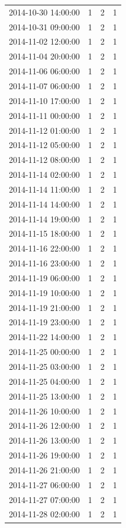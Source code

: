 \begin{tabular}{lrrr}
2014-10-30 14:00:00 & 1 & 2 & 1 \\
2014-10-31 09:00:00 & 1 & 2 & 1 \\
2014-11-02 12:00:00 & 1 & 2 & 1 \\
2014-11-04 20:00:00 & 1 & 2 & 1 \\
2014-11-06 06:00:00 & 1 & 2 & 1 \\
2014-11-07 06:00:00 & 1 & 2 & 1 \\
2014-11-10 17:00:00 & 1 & 2 & 1 \\
2014-11-11 00:00:00 & 1 & 2 & 1 \\
2014-11-12 01:00:00 & 1 & 2 & 1 \\
2014-11-12 05:00:00 & 1 & 2 & 1 \\
2014-11-12 08:00:00 & 1 & 2 & 1 \\
2014-11-14 02:00:00 & 1 & 2 & 1 \\
2014-11-14 11:00:00 & 1 & 2 & 1 \\
2014-11-14 14:00:00 & 1 & 2 & 1 \\
2014-11-14 19:00:00 & 1 & 2 & 1 \\
2014-11-15 18:00:00 & 1 & 2 & 1 \\
2014-11-16 22:00:00 & 1 & 2 & 1 \\
2014-11-16 23:00:00 & 1 & 2 & 1 \\
2014-11-19 06:00:00 & 1 & 2 & 1 \\
2014-11-19 10:00:00 & 1 & 2 & 1 \\
2014-11-19 21:00:00 & 1 & 2 & 1 \\
2014-11-19 23:00:00 & 1 & 2 & 1 \\
2014-11-22 14:00:00 & 1 & 2 & 1 \\
2014-11-25 00:00:00 & 1 & 2 & 1 \\
2014-11-25 03:00:00 & 1 & 2 & 1 \\
2014-11-25 04:00:00 & 1 & 2 & 1 \\
2014-11-25 13:00:00 & 1 & 2 & 1 \\
2014-11-26 10:00:00 & 1 & 2 & 1 \\
2014-11-26 12:00:00 & 1 & 2 & 1 \\
2014-11-26 13:00:00 & 1 & 2 & 1 \\
2014-11-26 19:00:00 & 1 & 2 & 1 \\
2014-11-26 21:00:00 & 1 & 2 & 1 \\
2014-11-27 06:00:00 & 1 & 2 & 1 \\
2014-11-27 07:00:00 & 1 & 2 & 1 \\
2014-11-28 02:00:00 & 1 & 2 & 1 \\

\end{tabular}
